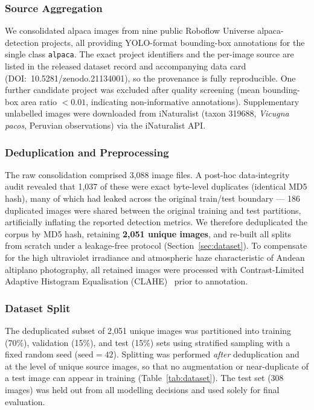 \documentclass[journal=animals,article=article,submit=mdpi,moreauthors=true,pdftex]{mdpi}
\begin{document}
\subsubsection{Source Aggregation}

We consolidated alpaca images from nine public Roboflow Universe alpaca-detection
projects, all providing YOLO-format bounding-box annotations for the single class
\texttt{alpaca}. The exact project identifiers and the per-image source are listed in the
released dataset record and accompanying data card (DOI:~10.5281/zenodo.21134001), so the
provenance is fully reproducible. One further candidate project was excluded after quality
screening (mean bounding-box area ratio $< 0.01$, indicating non-informative annotations).
Supplementary unlabelled images were downloaded from iNaturalist (taxon 319688,
\textit{Vicugna pacos}, Peruvian observations) via the iNaturalist API.

\subsubsection{Deduplication and Preprocessing}

The raw consolidation comprised 3,088 image files. A post-hoc data-integrity audit
revealed that 1,037 of these were exact byte-level duplicates (identical MD5 hash),
many of which had leaked across the original train/test boundary --- 186 duplicated
images were shared between the original training and test partitions, artificially
inflating the reported detection metrics. We therefore deduplicated the corpus by MD5
hash, retaining \textbf{2,051 unique images}, and re-built all splits from scratch under
a leakage-free protocol (Section~\ref{sec:dataset}).
To compensate for the high ultraviolet irradiance and atmospheric haze characteristic
of Andean altiplano photography, all retained images were processed with Contrast-Limited
Adaptive Histogram Equalisation (CLAHE)~\cite{pizer1987} prior to annotation.

\subsubsection{Dataset Split}

The deduplicated subset of 2,051 unique images was partitioned into training (70\%),
validation (15\%), and test (15\%) sets using stratified sampling with a fixed random
seed ($\mathrm{seed} = 42$). Splitting was performed \emph{after} deduplication and at
the level of unique source images, so that no augmentation or near-duplicate of a test
image can appear in training (Table~\ref{tab:dataset}).
The test set (308 images) was held out from all modelling decisions and used solely
for final evaluation.
\end{document}
